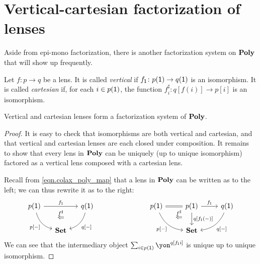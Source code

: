 \documentclass[Book-Poly]{subfiles}
\begin{document}

\section{Vertical-cartesian factorization of lenses}



Aside from epi-mono factorization, there is another factorization system on $\mathbf{Poly}$ that will show up frequently.

\begin{definition} \label{def.vert_cart}
Let $f\colon p\to q$ be a lens.
It is called \emph{vertical} if $f_{\textsf{1}}\colon p(\textsf{1})\to q(\textsf{1})$ is an isomorphism.
It is called \emph{cartesian} if, for each $i\in p(\textsf{1})$, the function $f^\sharp_i\colon q[f(i)]\to p[i]$ is an isomorphism.
\end{definition}



\begin{proposition}\label{prop.vert_cart_factorization}
Vertical and cartesian lenses form a factorization system of $\mathbf{Poly}$.
\end{proposition}
\begin{proof}
It is easy to check that isomorphisms are both vertical and cartesian, and that vertical and cartesian lenses are each closed under composition.
It remains to show that every lens in $\mathbf{Poly}$ can be uniquely (up to unique isomorphism) factored as a vertical lens composed with a cartesian lens.


Recall from \eqref{eqn.colax_poly_map} that a lens in $\mathbf{Poly}$ can be written as to the left; we can thus rewrite it as to the right:
\[
\begin{tikzcd}[column sep=small]
	p(\1)\ar[dr, bend right, "{p[-]}"']\ar[rr, "f_\1"]&~&
	q(\1)\ar[dl, bend left, "{q[-]}"]\\&
	\smset\ar[u, phantom, near end, "\overset{f^\sharp}{\Leftarrow}"]
\end{tikzcd}
\hspace{1in}
\begin{tikzcd}
	p(\1)\ar[dr, bend right, "{p[-]}"']\ar[r, equal, ""' name=equal]&
	p(\1)\ar[d, "{q[f_\1(-)]}"]\ar[r, "f_\1"]&
	q(\1)\ar[dl, bend left, "{q[-]}"]\\&
	|[alias=set]|\smset\ar[from=equal, to=set, pos=.3, phantom, "\overset{f^\sharp}{\Leftarrow}"]
\end{tikzcd}
\]
We can see that the intermediary object $\sum_{i\in p(\1)} \yon^{q[f_\1i]}$ is unique up to unique isomorphism.
\end{proof}
\end{document}
